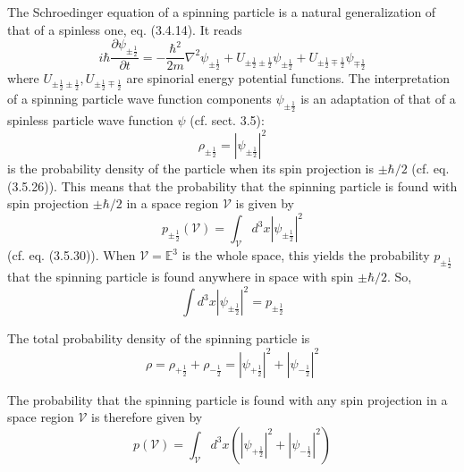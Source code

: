 \documentclass{article}
\begin{document}
The Schroedinger equation of a spinning particle is a natural generalization of that of a spinless one, eq. (3.4.14). It reads
$$
\begin{equation*}
i \hbar \frac{\partial \psi_{ \pm \frac{1}{2}}}{\partial t}=-\frac{\hbar^{2}}{2 m} \nabla^{2} \psi_{ \pm \frac{1}{2}}+U_{ \pm \frac{1}{2} \pm \frac{1}{2}} \psi_{ \pm \frac{1}{2}}+U_{ \pm \frac{1}{2} \mp \frac{1}{2}} \psi_{\mp \frac{1}{2}} \tag{3.21.1}
\end{equation*}
$$
where $U_{ \pm \frac{1}{2} \pm \frac{1}{2}}, U_{ \pm \frac{1}{2} \mp \frac{1}{2}}$ are spinorial energy potential functions.
The interpretation of a spinning particle wave function components $\psi_{ \pm \frac{1}{2}}$ is an adaptation of that of a spinless particle wave function $\psi$ (cf. sect. 3.5):
$$
\begin{equation*}
\rho_{ \pm \frac{1}{2}}=\left|\psi_{ \pm \frac{1}{2}}\right|^{2} \tag{3.21.2}
\end{equation*}
$$
is the probability density of the particle when its spin projection is $\pm \hbar / 2$ (cf. eq. (3.5.26)). This means that the probability that the spinning particle is found with spin projection $\pm \hbar / 2$ in a space region $\mathcal{V}$ is given by
$$
\begin{equation*}
p_{ \pm \frac{1}{2}}(\mathcal{V})=\int_{\mathcal{V}} d^{3} x\left|\psi_{ \pm \frac{1}{2}}\right|^{2} \tag{3.21.3}
\end{equation*}
$$
(cf. eq. (3.5.30)). When $\mathcal{V}=\mathbb{E}^{3}$ is the whole space, this yields the probability $p_{ \pm \frac{1}{2}}$ that the spinning particle is found anywhere in space with spin $\pm \hbar / 2$. So,
$$
\begin{equation*}
\int d^{3} x\left|\psi_{ \pm \frac{1}{2}}\right|^{2}=p_{ \pm \frac{1}{2}} \tag{3.21.4}
\end{equation*}
$$

The total probability density of the spinning particle is
$$
\begin{equation*}
\rho=\rho_{+\frac{1}{2}}+\rho_{-\frac{1}{2}}=\left|\psi_{+\frac{1}{2}}\right|^{2}+\left|\psi_{-\frac{1}{2}}\right|^{2} \tag{3.21.5}
\end{equation*}
$$

The probability that the spinning particle is found with any spin projection in a space region $\mathcal{V}$ is therefore given by
$$
\begin{equation*}
p(\mathcal{V})=\int_{\mathcal{V}} d^{3} x\left(\left|\psi_{+\frac{1}{2}}\right|^{2}+\left|\psi_{-\frac{1}{2}}\right|^{2}\right) \tag{3.21.6}
\end{equation*}
$$
\end{document}
